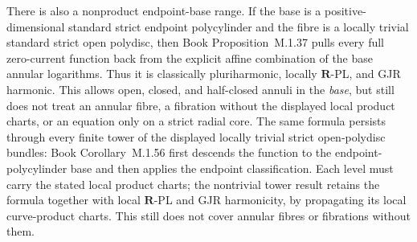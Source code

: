 \documentclass[11pt,a4paper]{article}
\theoremstyle{definition}
\theoremstyle{remark}
\begin{document}
There is also a nonproduct endpoint-base range.  If the base is a positive-
dimensional standard strict endpoint polycylinder and the fibre is a locally
trivial standard strict open polydisc, then
Book Proposition~M.1.37 pulls every full
zero-current function back from the explicit affine combination of the base
annular logarithms.  Thus it is classically pluriharmonic, locally
\(\mathbf R\)-PL, and GJR harmonic.  This allows open, closed, and
half-closed annuli in the \emph{base}, but still does not treat an annular
fibre, a fibration without the displayed local product charts, or an equation
only on a strict radial core.
The same formula persists through every finite tower of the displayed locally
trivial strict open-polydisc bundles:
Book Corollary~M.1.56 first descends the
function to the endpoint-polycylinder base and then applies the endpoint
classification.  Each level must carry the stated local product charts; the
nontrivial tower result retains the formula together with local
\(\mathbf R\)-PL and GJR harmonicity, by propagating its local curve-product
charts.  This still does not cover annular fibres or fibrations without
them.
\end{document}
